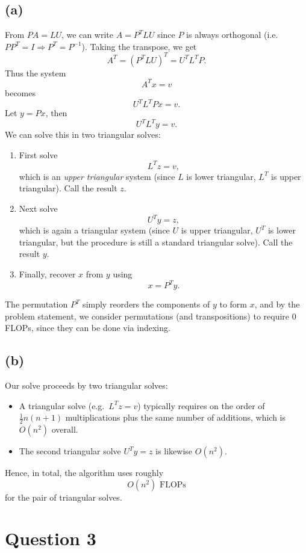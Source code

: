 \documentclass{article}
\begin{document}
\subsection*{(a)}
From $PA = LU$, we can write $A = P^T LU$ since $P$ is always orthogonal (i.e. $PP^T=I\Longrightarrow P^T=P^{-1}$). Taking the transpose, we get
$$
    A^T = (P^T LU)^T = U^TL^TP.
$$
Thus the system
$$
    A^T x = v
$$
becomes
$$
    U^T  L^T  P  x = v.
$$
Let $y = Px$, then
$$
    U^T  L^T  y = v.
$$
We can solve this in two triangular solves:
\begin{enumerate}
    \item First solve
          $$
              L^Tz = v,
          $$
          which is an \emph{upper triangular} system (since $L$ is lower triangular, $L^T$ is upper triangular). Call the result $z$.
    \item Next solve
          $$
              U^Ty = z,
          $$
          which is again a triangular system (since $U$ is upper triangular, $U^T$ is lower triangular, but the procedure is still a standard triangular solve). Call the result $y$.
    \item Finally, recover $x$ from $y$ using
          $$
              x = P^T  y.
          $$
\end{enumerate}
The permutation $P^T$ simply reorders the components of $y$ to form $x$, and by the problem statement, we consider permutations (and transpositions) to require 0 FLOPs, since they can be done via indexing.

\subsection*{(b)}
Our solve proceeds by two triangular solves:
\begin{itemize}
    \item A triangular solve (e.g.\ $L^T z = v$) typically requires on the order of $\tfrac12n(n+1)$ multiplications plus the same number of additions, which is $O(n^2)$ overall.
    \item The second triangular solve $U^T y = z$ is likewise $O(n^2)$.
\end{itemize}

Hence, in total, the algorithm uses roughly
$$
    \boxed{O(n^2) \text{ FLOPs}}
$$
for the pair of triangular solves.

\newpage
\section*{Question 3}
\end{document}
